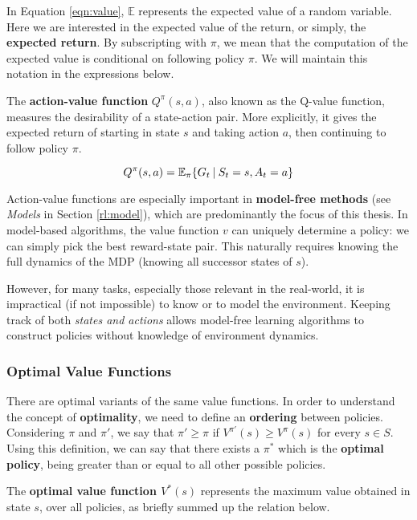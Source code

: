 In Equation \ref{eqn:value}, $\mathbb{E}$ represents the expected value of a random variable. Here we are interested in the expected value of the return, or simply, the \textbf{expected return}.
By subscripting with $\pi$, we mean that the computation of the expected value is conditional on following policy $\pi$.
We will maintain this notation in the expressions below.

The \textbf{action-value function} \(Q^{\pi}(s, a)\), also known as the Q-value function, measures the desirability of a state-action pair.
More explicitly, it gives the expected return of starting in state $s$ and taking action $a$, then continuing to follow policy $\pi$.

\begin{equation}
    Q^{\pi}(s, a) = \mathbb{E}_{\pi}\{ G_t \:\vert\: S_t = s, A_t = a \}
\end{equation}

Action-value functions are especially important in \textbf{model-free methods} (see \emph{Models} in Section \ref{rl:model}), which are predominantly the focus of this thesis.
In model-based algorithms, the value function $v$ can uniquely determine a policy: we can simply pick the best reward-state pair.
This naturally requires knowing the full dynamics of the MDP (knowing all successor states of $s$).

However, for many tasks, especially those relevant in the real-world, it is impractical (if not impossible) to know or to model the environment.
Keeping track of both \emph{states and actions} allows model-free learning algorithms to construct policies without knowledge of environment dynamics.

\subsubsection{Optimal Value Functions}

There are optimal variants of the same value functions.
In order to understand the concept of \textbf{optimality}, we need to define an \textbf{ordering} between policies.
Considering $\pi$ and $\pi'$, we say that $\pi' \geq \pi$ if $V^{\pi'}(s) \geq V^{\pi}(s)$ for every $s \in S$.
Using this definition, we can say that there exists a $\pi^{*}$ which is the \textbf{optimal policy}, being greater than or equal to all other possible policies.

The \textbf{optimal value function $V^*(s)$} represents the maximum value obtained in state $s$, over all policies, as briefly summed up the relation below.

